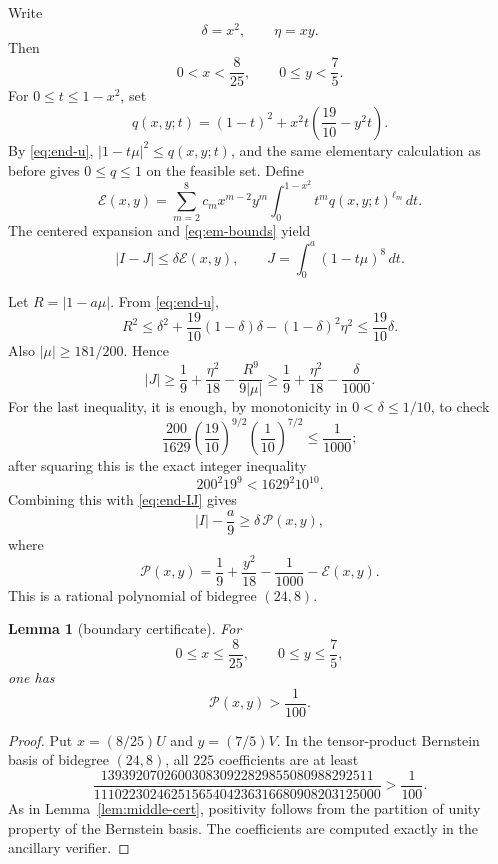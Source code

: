 \documentclass[11pt]{article}
\newtheorem{lemma}[theorem]{Lemma}
\theoremstyle{remark}
\begin{document}
Write
\[
 \delta=x^2,
 \qquad
 \eta=xy.
\]
Then
\begin{equation}\label{eq:end-box}
 0<x<\frac8{25},
 \qquad
 0\le y<\frac75.
\end{equation}
For $0\le t\le1-x^2$, set
\begin{equation}\label{eq:end-q}
 q(x,y;t)=(1-t)^2+x^2t\left(\frac{19}{10}-y^2t\right).
\end{equation}
By \eqref{eq:end-u},
$|1-t\mu|^2\le q(x,y;t)$, and the same elementary calculation as before gives
$0\le q\le1$ on the feasible set.  Define
\begin{equation}\label{eq:end-E}
 \mathcal E(x,y)=
 \sum_{m=2}^{8}c_mx^{m-2}y^m
 \int_0^{1-x^2}t^m q(x,y;t)^{\ell_m}\,dt.
\end{equation}
The centered expansion and \eqref{eq:em-bounds} yield
\begin{equation}\label{eq:end-IJ}
 |I-J|\le\delta\mathcal E(x,y),
 \qquad
 J=\int_0^a(1-t\mu)^8\,dt.
\end{equation}

Let $R=|1-a\mu|$.  From \eqref{eq:end-u},
\[
 R^2\le
 \delta^2+\frac{19}{10}(1-\delta)\delta-(1-\delta)^2\eta^2
 \le\frac{19}{10}\delta.
\]
Also $|\mu|\ge181/200$.  Hence
\[
 |J|
 \ge\frac19+\frac{\eta^2}{18}-\frac{R^9}{9|\mu|}
 \ge\frac19+\frac{\eta^2}{18}-\frac{\delta}{1000}.
\]
For the last inequality, it is enough, by monotonicity in
$0<\delta\le1/10$, to check
\[
 \frac{200}{1629}\left(\frac{19}{10}\right)^{9/2}
 \left(\frac1{10}\right)^{7/2}\le\frac1{1000};
\]
after squaring this is the exact integer inequality
\[
 200^2 19^9<1629^2 10^{10}.
\]
Combining this with \eqref{eq:end-IJ} gives
\begin{equation}\label{eq:end-final-reduction}
 |I|-\frac a9
 \ge\delta\,\mathcal P(x,y),
\end{equation}
where
\begin{equation}\label{eq:end-P}
 \mathcal P(x,y)=
 \frac19+\frac{y^2}{18}-\frac1{1000}-\mathcal E(x,y).
\end{equation}
This is a rational polynomial of bidegree $(24,8)$.

\begin{lemma}[boundary certificate]\label{lem:end-cert}
For
\[
 0\le x\le\frac8{25},
 \qquad
 0\le y\le\frac75,
\]
one has
\[
 \mathcal P(x,y)>\frac1{100}.
\]
\end{lemma}

\begin{proof}
Put $x=(8/25)U$ and $y=(7/5)V$.  In the tensor-product Bernstein basis of
bidegree $(24,8)$, all $225$ coefficients are at least
\[
 \frac{139392070260030830922829855080988292511}
 {11102230246251565404236316680908203125000}
 >\frac1{100}.
\]
As in Lemma~\ref{lem:middle-cert}, positivity follows from the partition of
unity property of the Bernstein basis.  The coefficients are computed exactly
in the ancillary verifier.
\end{proof}
\end{document}
